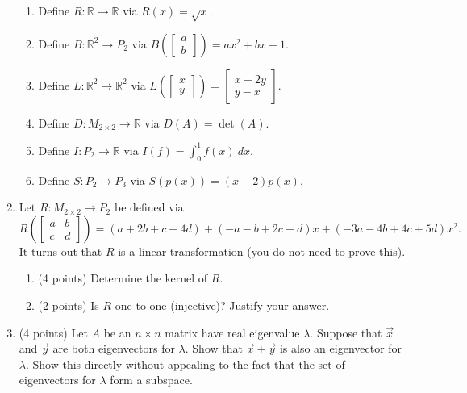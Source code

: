 \documentclass[11pt]{article}
\theoremstyle{definition}
\begin{document}
\begin{enumerate}
\begin{enumerate}
\item Define $R:\mathbb{R}\to \mathbb{R}$ via $R(x)=\sqrt{x}$.
\item Define $B:\mathbb{R}^2\to P_2$ via $B\left(\begin{bmatrix}a\\ b\end{bmatrix}\right)=ax^2+bx+1$.
\item Define $L:\mathbb{R}^2\to \mathbb{R}^2$ via $L\left(\begin{bmatrix}x\\ y\end{bmatrix}\right)=\begin{bmatrix}x+2y\\ y-x\end{bmatrix}$.
\item Define $D:M_{2\times 2} \to \mathbb{R}$ via $D(A)=\det(A)$.
\item Define $I:P_2\to \mathbb{R}$ via $\displaystyle I(f)=\int_0^1 f(x)\ dx$.
\item Define $S:P_2\to P_3$ via $S(p(x))=(x-2)p(x)$.
\end{enumerate}

\item Let $R:M_{2\times 2} \to P_2$ be defined via
\[
R\left(\begin{bmatrix}a & b\\ c & d\end{bmatrix}\right)=(a+2b+c-4d)+(-a-b+2c+d)x+(-3a-4b+4c+5d)x^2.
\]
It turns out that $R$ is a linear transformation (you do not need to prove this).

\begin{enumerate}
\item (4 points) Determine the kernel of $R$.

\item (2 points) Is $R$ one-to-one (injective)?  Justify your answer.

\end{enumerate}

\item (4 points) Let $A$ be an $n\times n$ matrix have real eigenvalue $\lambda$.  Suppose that $\vec{x}$ and $\vec{y}$ are both eigenvectors for $\lambda$.  Show that $\vec{x}+\vec{y}$ is also an eigenvector for $\lambda$.  Show this directly without appealing to the fact that the set of eigenvectors for $\lambda$ form a subspace.


\end{enumerate}
\end{document}
